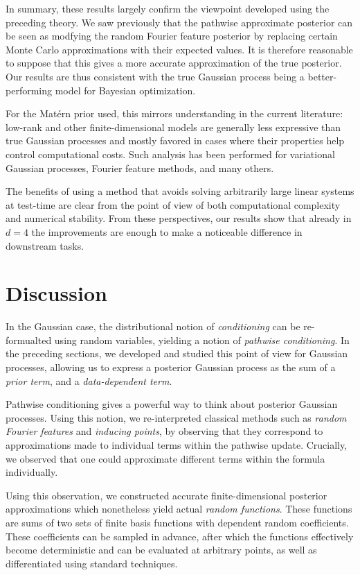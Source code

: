\documentclass[11pt]{book}
\begin{document}
In summary, these results largely confirm the viewpoint developed using the preceding theory.
We saw previously that the pathwise approximate posterior can be seen as modfying the random Fourier feature posterior by replacing certain Monte Carlo approximations with their expected values.
It is therefore reasonable to suppose that this gives a more accurate approximation of the true posterior.
Our results are thus consistent with the true Gaussian process being a better-performing model for Bayesian optimization.

For the Matérn prior used, this mirrors understanding in the current literature: low-rank and other finite-dimensional models are generally less expressive than true Gaussian processes and mostly favored in cases where their properties help control computational costs.
Such analysis has been performed for variational Gaussian processes, Fourier feature methods, and many others.

The benefits of using a method that avoids solving arbitrarily large linear systems at test-time are clear from the point of view of both computational complexity and numerical stability.
From these perspectives, our results show that already in $d=4$ the improvements are enough to make a noticeable difference in downstream tasks.


\section{Discussion}

In the Gaussian case, the distributional notion of \emph{conditioning} can be re-formualted using random variables, yielding a notion of \emph{pathwise conditioning}.
In the preceding sections, we developed and studied this point of view for Gaussian processes, allowing us to express a posterior Gaussian process as the sum of a \emph{prior term}, and a \emph{data-dependent term}.

Pathwise conditioning gives a powerful way to think about posterior Gaussian processes.
Using this notion, we re-interpreted classical methods such as \emph{random Fourier features} and \emph{inducing points}, by observing that they correspond to approximations made to individual terms within the pathwise update.
Crucially, we observed that one could approximate different terms within the formula individually.

Using this observation, we constructed accurate finite-dimensional posterior approximations which nonetheless yield actual \emph{random functions}.
These functions are sums of two sets of finite basis functions with dependent random coefficients.
These coefficients can be sampled in advance, after which the functions effectively become deterministic and can be evaluated at arbitrary points, as well as differentiated using standard techniques.
\end{document}
